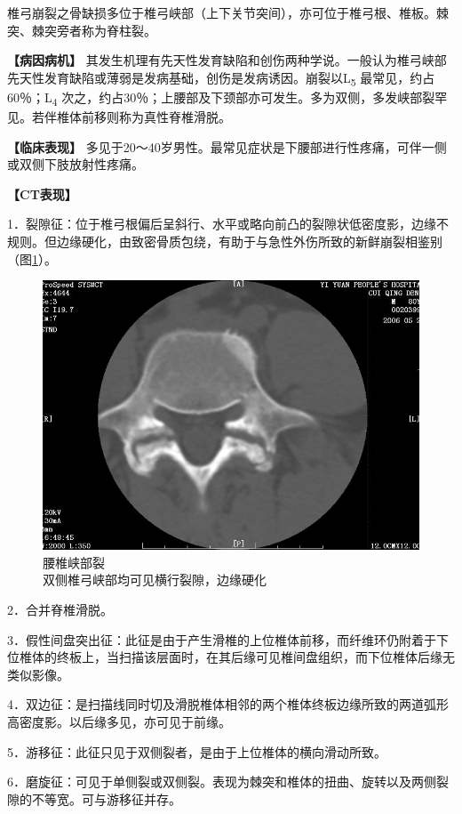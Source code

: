 椎弓崩裂之骨缺损多位于椎弓峡部（上下关节突间），亦可位于椎弓根、椎板。棘突、棘突旁者称为脊柱裂。

\textbf{【病因病机】}
其发生机理有先天性发育缺陷和创伤两种学说。一般认为椎弓峡部先天性发育缺陷或薄弱是发病基础，创伤是发病诱因。崩裂以L\textsubscript{5}
最常见，约占60％；L\textsubscript{4}
次之，约占30％；上腰部及下颈部亦可发生。多为双侧，多发峡部裂罕见。若伴椎体前移则称为真性脊椎滑脱。

\textbf{【临床表现】}
多见于20～40岁男性。最常见症状是下腰部进行性疼痛，可伴一侧或双侧下肢放射性疼痛。

\textbf{【CT表现】}

1．裂隙征：位于椎弓根偏后呈斜行、水平或略向前凸的裂隙状低密度影，边缘不规则。但边缘硬化，由致密骨质包绕，有助于与急性外伤所致的新鲜崩裂相鉴别（图\ref{fig23-11}）。

\begin{figure}[!htbp]
 \centering
 \includegraphics[width=.7\textwidth,height=\textheight,keepaspectratio]{./images/Image00474.jpg}
 \captionsetup{justification=centering}
 \caption{腰椎峡部裂\\{\small 双侧椎弓峡部均可见横行裂隙，边缘硬化}}
 \label{fig23-11}
  \end{figure} 

2．合并脊椎滑脱。

3．假性间盘突出征：此征是由于产生滑椎的上位椎体前移，而纤维环仍附着于下位椎体的终板上，当扫描该层面时，在其后缘可见椎间盘组织，而下位椎体后缘无类似影像。

4．双边征：是扫描线同时切及滑脱椎体相邻的两个椎体终板边缘所致的两道弧形高密度影。以后缘多见，亦可见于前缘。

5．游移征：此征只见于双侧裂者，是由于上位椎体的横向滑动所致。

6．磨旋征：可见于单侧裂或双侧裂。表现为棘突和椎体的扭曲、旋转以及两侧裂隙的不等宽。可与游移征并存。

